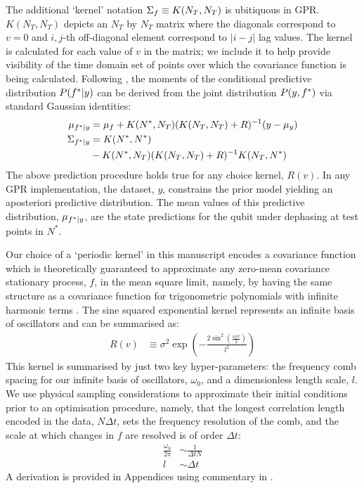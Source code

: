 \documentclass[pra, reprint]{revtex4-1}
\begin{document}
The additional `kernel' notation $\Sigma_f  \equiv K(N_T, N_T)$ is ubitiquous in GPR. $K(N_T, N_T)$ depicts an $N_T$ by $N_T$ matrix where the diagonals correspond to $v=0$ and $i, j$-th off-diagonal element correspond to $|i-j|$ lag values. The kernel is calculated for each value of $v$ in the matrix;  we include it to help provide visibility of the time domain set of points over which the covariance function is being calculated. Following \cite{rasmussen2005gaussian}, the moments of the conditional predictive distribution $P(f^*|y)$ can be derived from the joint distribution $P(y,f^*)$ via standard Gaussian identities:
\begin{align}
\mu_{f^*|y} &= \mu_f + K(N^*,N_T)(K(N_T,N_T) + R )^{-1} (y - \mu_y) \\
\Sigma_{f^*|y} &= K(N^*,N^*) \nonumber \\
& - K(N^*,N_T)(K(N_T, N_T) + R)^{-1}K(N_T,N^*) 
\end{align}
The above prediction procedure holds true for any choice kernel, $R(v)$. In any GPR implementation, the dataset, $y$, constrains the prior model yielding an aposteriori predictive distribution. The mean values of this predictive distribution, $\mu_{f^*|y}$, are the state predictions for the qubit under dephasing at test points in $N^*$.

Our choice of a `periodic kernel' in this manuscript encodes a covariance function which is theoretically guaranteed to approximate any zero-mean covariance stationary process, $f$, in the mean square limit, namely, by having the same structure as a covariance function for trigonometric polynomials with infinite harmonic terms \cite{solin2014explicit, karlin2012first}. The sine squared exponential kernel represents an infinite basis of oscillators and can be summarised as:
\begin{align}
R(v) &\equiv \sigma^2 \exp (- \frac{2\sin^2(\frac{\omega_0 v}{2})}{l^2}) 
\end{align} 
This kernel is summarised by just two key hyper-parameters: the frequency comb spacing for our infinite basis of oscillators, $\omega_0$, and a dimensionless length scale, $l$. We use physical sampling considerations to approximate their initial conditions prior to an optimisation procedure, namely, that the longest correlation length encoded in the data, $N \Delta t $, sets the frequency resolution of the comb, and the scale at which changes in $f$ are resolved is of order $\Delta t$:
\begin{align}
\frac{\omega_0}{2\pi} & \sim  \frac{1}{\Delta t N} \\
l & \sim \Delta t
\end{align} 
A derivation is provided in Appendices using commentary in \cite{solin2014explicit}.
\end{document}
